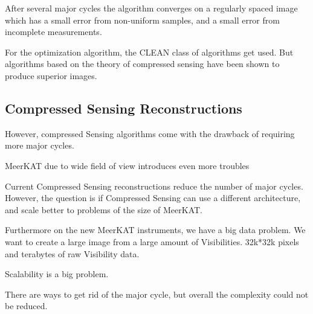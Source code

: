 After several major cycles the algorithm converges on a regularly spaced image which has a small error from non-uniform samples, and a small error from incomplete measurements.

For the optimization algorithm, the CLEAN class of algorithms get used. But algorithms based on the theory of compressed sensing have been shown to produce superior images.


\subsection{Compressed Sensing Reconstructions}
 However, compressed Sensing algorithms come with the drawback of requiring more major cycles.

MeerKAT due to wide field of view introduces even more troubles

Current Compressed Sensing reconstructions reduce the number of major cycles. However, the question is if Compressed Sensing can use a different architecture, and scale better to problems of the size of MeerKAT.

Furthermore on the new MeerKAT instruments, we have a big data problem. We want to create a large image from a large amount of Visibilities. 32k*32k pixels and terabytes of raw Visibility data. 

Scalability is a big problem.

There are ways to get rid of the major cycle, but overall the complexity could not be reduced.









